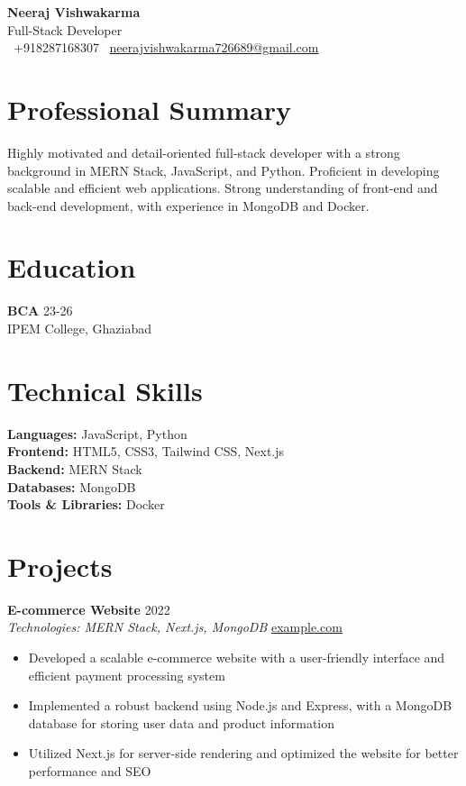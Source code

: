 \documentclass[a4paper,11pt]{article}
\begin{document}
\begin{center}
{\LARGE \textbf{Neeraj Vishwakarma}} \\[2pt]
Full-Stack Developer \\[3pt]
{\small
\faPhone\ +918287168307 \hspace{0.5em}
\faEnvelope\ \href{mailto:neerajvishwakarma726689@gmail.com}{neerajvishwakarma726689@gmail.com} \hspace{0.5em}
}
\end{center}

\section*{Professional Summary}
Highly motivated and detail-oriented full-stack developer with a strong background in MERN Stack, JavaScript, and Python. Proficient in developing scalable and efficient web applications. Strong understanding of front-end and back-end development, with experience in MongoDB and Docker.

\section*{Education}
\textbf{BCA} \hfill 23-26 \\
IPEM College, Ghaziabad

\section*{Technical Skills}
\textbf{Languages:} JavaScript, Python \\
\textbf{Frontend:} HTML5, CSS3, Tailwind CSS, Next.js \\
\textbf{Backend:} MERN Stack \\
\textbf{Databases:} MongoDB \\
\textbf{Tools \& Libraries:} Docker

\section*{Projects}
\textbf{E-commerce Website} \hfill 2022 \\
\textit{Technologies: MERN Stack, Next.js, MongoDB} \hfill \href{https://example.com}{example.com}
\begin{itemize}[noitemsep, topsep=1pt, itemsep=1pt, leftmargin=*]
\item Developed a scalable e-commerce website with a user-friendly interface and efficient payment processing system
\item Implemented a robust backend using Node.js and Express, with a MongoDB database for storing user data and product information
\item Utilized Next.js for server-side rendering and optimized the website for better performance and SEO
\end{itemize}
\end{document}
